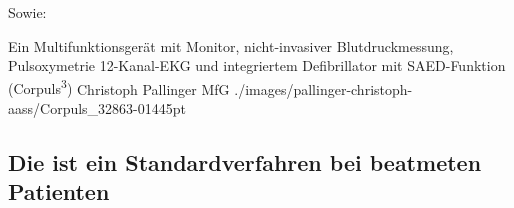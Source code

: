 \begin{Literary}

  

  
  Sowie:
  \cite{EcgEmergencyDec2,Harrisons18DeKap228,KuehnEkgFortbildung02T1,KuehnEkgFortbildung03T2}
  
\end{Literary}

\PictureWide
{Ein Multifunktionsgerät mit Monitor, nicht-invasiver Blutdruckmessung, Pulsoxymetrie 12-Kanal-EKG und integriertem Defibrillator mit SAED-Funktion (Corpuls\textsuperscript{3}\texttrademark)}%
{}%
{\label{fig:corpuls3}}%
{Christoph Pallinger}%
{MfG}%
{./images/pallinger-christoph-aass/Corpuls_32863-01445pt}%
{}%
{}%

\clearpage





\subsection{Die  ist ein Standardverfahren bei beatmeten Patienten}

